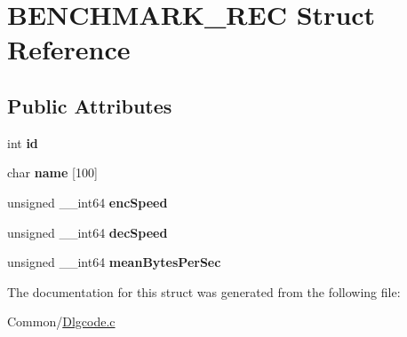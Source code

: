 \hypertarget{struct_b_e_n_c_h_m_a_r_k___r_e_c}{}\section{B\+E\+N\+C\+H\+M\+A\+R\+K\+\_\+\+R\+EC Struct Reference}
\label{struct_b_e_n_c_h_m_a_r_k___r_e_c}
\subsection*{Public Attributes}
\begin{DoxyCompactItemize}
\item 
\mbox{\label{struct_b_e_n_c_h_m_a_r_k___r_e_c_a2699047d5b1ed03b6279f40d29a7d105}} 
int {\bfseries id}
\item 
\mbox{\label{struct_b_e_n_c_h_m_a_r_k___r_e_c_a8f1d27c6b22cec4ff4624e4e53dd39a8}} 
char {\bfseries name} \mbox{[}100\mbox{]}
\item 
\mbox{\label{struct_b_e_n_c_h_m_a_r_k___r_e_c_a4f1e6642ada8f3137cca653e2407f760}} 
unsigned \+\_\+\+\_\+int64 {\bfseries enc\+Speed}
\item 
\mbox{\label{struct_b_e_n_c_h_m_a_r_k___r_e_c_ad0494915f1a07f613fcca1247ab7f9fb}} 
unsigned \+\_\+\+\_\+int64 {\bfseries dec\+Speed}
\item 
\mbox{\label{struct_b_e_n_c_h_m_a_r_k___r_e_c_a02b2e48096d1746ec3eef1e4280f7654}} 
unsigned \+\_\+\+\_\+int64 {\bfseries mean\+Bytes\+Per\+Sec}
\end{DoxyCompactItemize}


The documentation for this struct was generated from the following file\+:\begin{DoxyCompactItemize}
\item 
Common/\hyperlink{_dlgcode_8c}{Dlgcode.\+c}\end{DoxyCompactItemize}
